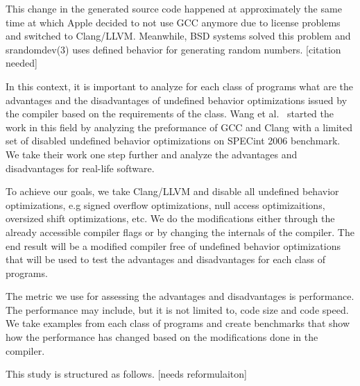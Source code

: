This change in the generated source code happened at approximately the
same time at which Apple decided to not use GCC anymore due to license
problems and switched to Clang/LLVM. Meanwhile, BSD systems solved this
problem and srandomdev(3) uses defined behavior for generating random
numbers. [citation needed]

In this context, it is important to analyze for each class of programs
what are the advantages and the disadvantages of undefined behavior
optimizations issued by the compiler based on the requirements of the
class. Wang et al.~\cite{wang2012undefined} started the work in this
field by analyzing the preformance of GCC and Clang with a limited set
of disabled undefined behavior optimizations on SPECint 2006 benchmark.
We take their work one step further and analyze the advantages and
disadvantages for real-life software.

To achieve our goals, we take Clang/LLVM and disable all undefined
behavior optimizations, e.g signed overflow optimizations, null access
optimizaitions, oversized shift optimizations, etc. We do the
modifications either through the already accessible compiler flags
or by changing the internals of the compiler. The end result will be a
modified compiler free of undefined behavior optimizations that will be
used to test the advantages and disadvantages for each class of
programs.

The metric we use for assessing the advantages and disadvantages is
performance. The performance may include, but it is not limited to, code
size and code speed. We take examples from each class of programs and
create benchmarks that show how the performance has changed based on the
modifications done in the compiler.

This study is structured as follows. [needs reformulaiton]
